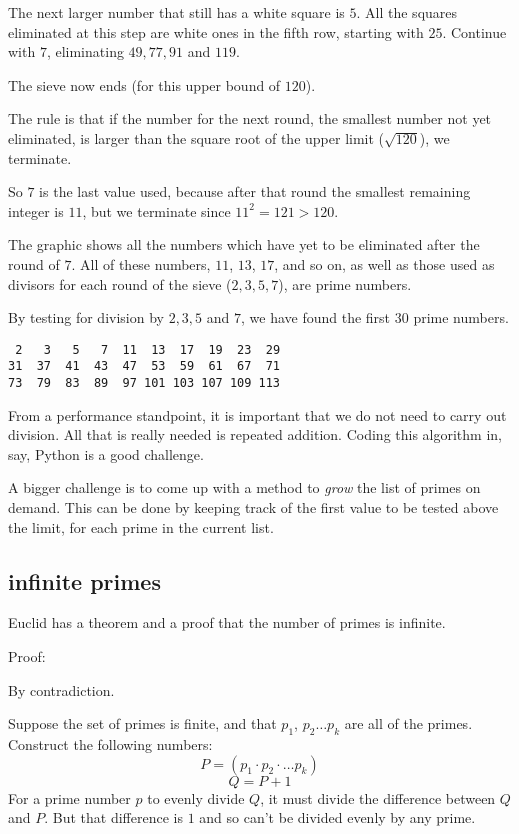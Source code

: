 \documentclass[11pt, oneside]{article}
\begin{document}
The next larger number that still has a white square is $5$.  All the squares eliminated at this step are white ones in the fifth row, starting with $25$.  Continue with $7$, eliminating $49, 77, 91$ and $119$.

The sieve now ends (for this upper bound of $120$).  

The rule is that if the number for the next round, the smallest number not yet eliminated, is larger than the square root of the upper limit ($\sqrt{120}$), we terminate.  

So $7$ is the last value used, because after that round the smallest remaining integer is $11$, but we terminate since $11^2 = 121 > 120$.

The graphic shows all the numbers which have yet to be eliminated after the round of $7$.   All of these numbers, $11$, $13$, $17$, and so on, as well as those used as divisors for each round of the sieve ($2, 3, 5, 7$), are prime numbers.

By testing for division by $2, 3, 5$ and $7$, we have found the first $30$ prime numbers.

\begin{verbatim}
 2   3   5   7  11  13  17  19  23  29
31  37  41  43  47  53  59  61  67  71 
73  79  83  89  97 101 103 107 109 113
\end{verbatim}

From a performance standpoint, it is important that we do not need to carry out division.  All that is really needed is repeated addition.  Coding this algorithm in, say, Python is a good challenge.  

A bigger challenge is to come up with a method to \emph{grow} the list of primes on demand.  This can be done by keeping track of the first value to be tested above the limit, for each prime in the current list.

\subsection*{infinite primes}

Euclid has a theorem and a proof that the number of primes is infinite.

Proof:

By contradiction.

Suppose the set of primes is finite, and that $p_1$, $p_2 \dots p_k$ are all of the primes.  Construct the following numbers:
\[ P = (p_1 \cdot p_2 \cdot \dots p_k)  \]
\[ Q = P + 1 \]
For a prime number $p$ to evenly divide $Q$, it must divide the difference between $Q$ and $P$.  But that difference is $1$ and so can't be divided evenly by any prime.
\end{document}
